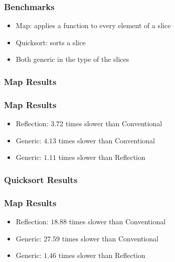 \documentclass[12pt]{beamer}
\begin{document}

\begin{frame}[fragile]
\frametitle{Benchmarks}
\begin{itemize}
\item Map: applies a function to every element of a slice
\item Quicksort: sorts a slice
\item Both generic in the type of the slices
\end{itemize}
\end{frame}


\begin{frame}
\frametitle{Map Results}
\begin{figure}
    \centering
    
\end{figure}
\end{frame}


\begin{frame}[fragile]
\frametitle{Map Results}
\begin{itemize}
\item Reflection: $3.72$ times slower than Conventional
\item Generic: $4.13$ times slower than Conventional
\item Generic: $1.11$ times slower than Reflection
\end{itemize}
\end{frame}


\begin{frame}
\frametitle{Quicksort Results}
\begin{figure}
    \centering
    
\end{figure}
\end{frame}


\begin{frame}[fragile]
\frametitle{Map Results}
\begin{itemize}
\item Reflection: $18.88$ times slower than Conventional
\item Generic: $27.59$ times slower than Conventional
\item Generic: $1.46$ times slower than Reflection
\end{itemize}
\end{frame}
\end{document}
